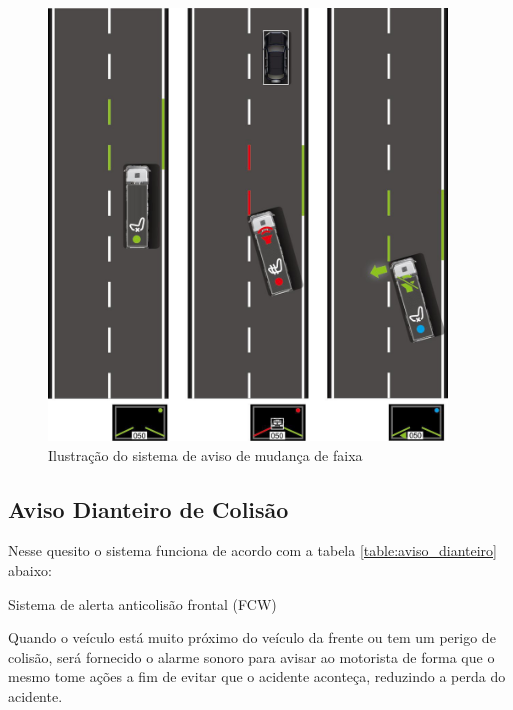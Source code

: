 \begin{figure}[h]
  \centering
  \includegraphics[width=400px, scale=1]{figuras/aviso_mudanca_faixa}
  \caption{Ilustração do sistema de aviso de mudança de faixa}
\label{fig:aviso_mudanca_faixa}
\end{figure}

\subsection{Aviso Dianteiro de Colisão}

Nesse quesito o sistema funciona de acordo com a tabela \ref{table:aviso_dianteiro} abaixo:

Sistema de alerta anticolisão frontal (FCW)

Quando o veículo está muito próximo do veículo da frente ou tem um perigo de colisão, será fornecido o alarme sonoro para avisar ao motorista de forma que o mesmo tome ações a fim de evitar que o acidente aconteça, reduzindo a perda do acidente.

